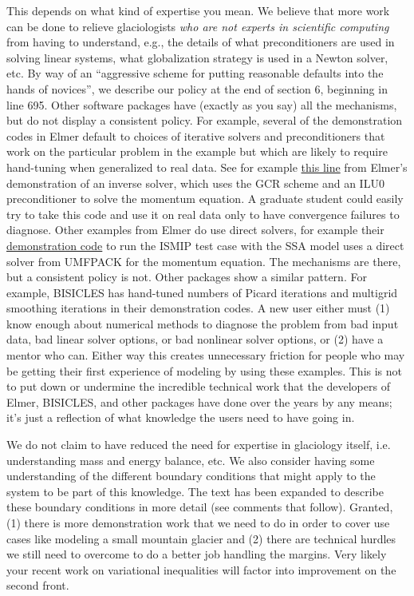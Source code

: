 \documentclass{article}
\theoremstyle{definition}
\theoremstyle{plain}
\begin{document}
This depends on what kind of expertise you mean.
We believe that more work can be done to relieve glaciologists \emph{who are not experts in scientific computing} from having to understand, e.g., the details of what preconditioners are used in solving linear systems, what globalization strategy is used in a Newton solver, etc.
By way of an ``aggressive scheme for putting reasonable defaults into the hands of novices'', we describe our policy at the end of section 6, beginning in line 695.
Other software packages have (exactly as you say) all the mechanisms, but do not display a consistent policy.
For example, several of the demonstration codes in Elmer default to choices of iterative solvers and preconditioners that work on the particular problem in the example but which are likely to require hand-tuning when generalized to real data.
See for example \href{https://github.com/ElmerCSC/elmerfem/blob/aaa6c4a345c73ba248c475d27975c5e3a9fa7758/elmerice/examples/Inverse_Methods/MacAyeal_Stokes/SIF/OPTIM_CONT.sif#L161}{this line} from Elmer's demonstration of an inverse solver, which uses the GCR scheme and an ILU0 preconditioner to solve the momentum equation.
A graduate student could easily try to take this code and use it on real data only to have convergence failures to diagnose.
Other examples from Elmer do use direct solvers, for example their \href{https://github.com/ElmerCSC/elmerfem/blob/aaa6c4a345c73ba248c475d27975c5e3a9fa7758/elmerice/examples/Test_SSA/ismip_SSA_2D.sif#L105}{demonstration code} to run the ISMIP test case with the SSA model uses a direct solver from UMFPACK for the momentum equation.
The mechanisms are there, but a consistent policy is not.
Other packages show a similar pattern.
For example, BISICLES has hand-tuned numbers of Picard iterations and multigrid smoothing iterations in their demonstration codes.
A new user either must (1) know enough about numerical methods to diagnose the problem from bad input data, bad linear solver options, or bad nonlinear solver options, or (2) have a mentor who can.
Either way this creates unnecessary friction for people who may be getting their first experience of modeling by using these examples.
This is not to put down or undermine the incredible technical work that the developers of Elmer, BISICLES, and other packages have done over the years by any means; it's just a reflection of what knowledge the users need to have going in.

We do not claim to have reduced the need for expertise in glaciology itself, i.e. understanding mass and energy balance, etc.
We also consider having some understanding of the different boundary conditions that might apply to the system to be part of this knowledge.
The text has been expanded to describe these boundary conditions in more detail (see comments that follow).
Granted, (1) there is more demonstration work that we need to do in order to cover use cases like modeling a small mountain glacier and (2) there are technical hurdles we still need to overcome to do a better job handling the margins.
Very likely your recent work on variational inequalities will factor into improvement on the second front.
\end{document}
